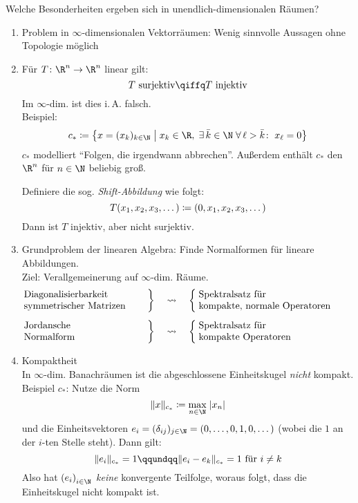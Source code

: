 \begin{thEmpty}
    Welche Besonderheiten ergeben sich in unendlich-dimensionalen Räumen?
    \begin{enumerate}[(1)]
        \item
            Problem in $\infty$-dimensionalen Vektorräumen:
            Wenig sinnvolle Aussagen ohne Topologie möglich
        \item
            Für $T\colon\R^n\to\R^n$ linear gilt:
            \[ T\text{ surjektiv} \qiffq T\text{ injektiv} \]
            Im $\infty$-dim. ist dies i.\,A. falsch.\\
            Beispiel:
            \[ c_\ast \defeq \left\{ 
                x=(x_k)_{k\in\N} \Mid x_k\in\R,\; \exists\,\bar k\in\N\;
                \forall\, \ell>\bar k\colon\; x_\ell = 0
            \right\}
        \]
        $c_\ast$ modelliert \enquote{Folgen, die irgendwann abbrechen}.
        Außerdem enthält $c_\ast$ den $\R^n$ für $n\in\N$ beliebig groß.

        Definiere die sog. \emph{Shift-Abbildung} wie folgt:
        \[ T(x_1,x_2,x_3,\dots) \coloneqq (0,x_1,x_2,x_3,\dots) \]
        Dann ist $T$ injektiv, aber nicht surjektiv.

    \item
        Grundproblem der linearen Algebra: Finde Normalformen für lineare
        Abbildungen.\\
        Ziel: Verallgemeinerung auf $\infty$-dim. Räume.
        \begin{align*}
            \left. \parbox{4.5cm}{Diagonalisierbarkeit\\symmetrischer Matrizen}
            \right\} &\quad\rightsquigarrow\quad
            \left\{\; \parbox{6cm}{Spektralsatz für\\kompakte, normale Operatoren}
            \right.
            \\[1ex]
            \left. \parbox{4.5cm}{Jordansche\\Normalform\vphantom{y}}
            \right\} &\quad\rightsquigarrow\quad
            \left\{\; \parbox{6cm}{Spektralsatz für\\kompakte Operatoren}
            \right.
        \end{align*}

    \item
        Kompaktheit\\
        In $\infty$-dim. Banachräumen ist die abgeschlossene Einheitskugel
        \emph{nicht} kompakt.\\
        Beispiel $c_\ast$: Nutze die Norm
        \[ \norm{x}_{c_\ast} \defeq \max_{n\in\N} \;\abs{x_n} \]
        und die Einheitsvektoren $e_i = (\kron{ij})_{j\in\N} =
        (0,\dots,0,1,0,\dots)$ (wobei die $1$ an der $i$-ten Stelle steht).
        Dann gilt:
        \[ \norm{e_i}_{c_\ast} = 1 \qqundqq \norm{e_i-e_k}_{c_\ast} = 1 \text{
        für $i\neq k$}
        \]
        Also hat $\iSeq e$ \emph{keine} konvergente Teilfolge, woraus folgt,
        dass die Einheitskugel nicht kompakt ist.


\end{enumerate}
\end{thEmpty}
